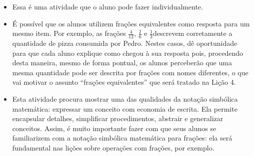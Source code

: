 \begin{orientacoes}
  \begin{itemize} %
    \item       Essa é uma atividade que o aluno pode fazer individualmente.
    \item       É possível que os alunos utilizem frações equivalentes como resposta para um mesmo item. Por exemplo, as frações       $\frac{4}{12}$,       $\frac{2}{6}$ e       $\frac{1}{3}$descrevem corretamente a quantidade de pizza consumida por Pedro. Nestes casos, dê oportunidade para que cada aluno explique como chegou à sua resposta pois, procedendo desta maneira, mesmo de forma pontual, os alunos perceberão que uma mesma quantidade pode ser descrita por frações com nomes diferentes, o que vai motivar o assunto ``frações equivalentes''     que será tratado na Lição 4.
    \item       Esta atividade procura mostrar uma das qualidades da notação simbólica matemática: expressar um conceito com economia de escrita. Ela permite encapsular detalhes, simplificar procedimentos, abstrair e generalizar conceitos. Assim, é muito importante fazer com que seus alunos se familiarizem com a notação simbólica matemática para frações: ela será fundamental nas lições sobre operações com frações, por exemplo.
\end{itemize} %





%
\end{orientacoes}

